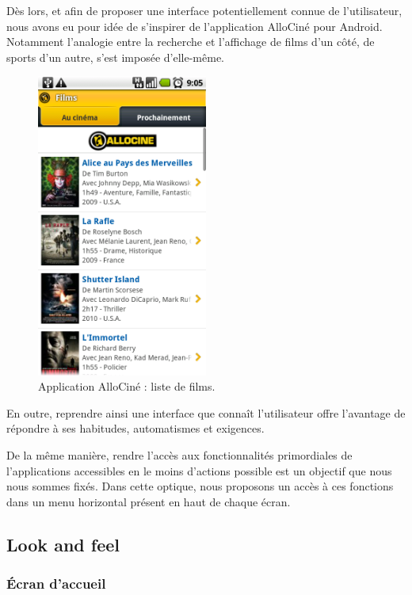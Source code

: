 \documentclass[french, titlepage, 11pt, a4paper]{article}
\begin{document}
	Dès lors, et afin de proposer une interface potentiellement connue de
	l'utilisateur, nous avons eu pour idée de s'inspirer de l'application AlloCiné
	pour Android.
	Notamment l'analogie entre la recherche et l'affichage de films d'un côté, de
	sports d'un autre, s'est imposée d'elle-même.

	\begin{figure}[ht]
		\centering
		\includegraphics[width=0.5\textwidth]{allocine.png}
		\caption{Application AlloCiné : liste de films.}
		\label{fig:allocine}
	\end{figure}

	En outre, reprendre ainsi une interface que connaît l'utilisateur offre
	l'avantage de répondre à ses habitudes, automatismes et exigences.

	De la même manière, rendre l'accès aux fonctionnalités primordiales de
	l'applications accessibles en le moins d'actions possible est un objectif que
	nous nous sommes fixés.
	Dans cette optique, nous proposons un accès à ces fonctions dans un menu
	horizontal présent en haut de chaque écran.

	\subsection{Look and feel}

		\subsubsection{Écran d'accueil}
\end{document}
